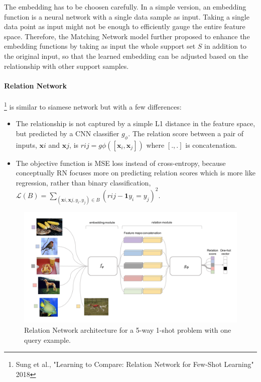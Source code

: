 \documentclass[main]{subfiles}
\begin{document}
The embedding has to be choosen carefully. In a simple version, an embedding function is a neural network with a single data sample as input. Taking a single data point as input might not be enough to efficiently gauge the entire feature space. Therefore, the Matching Network model further proposed to enhance the embedding functions by taking as input the whole support set $S$ in addition to the original input, so that the learned embedding can be adjusted based on the relationship with other support samples.

\paragraph{Relation Network}\footnote{Sung et al., "Learning to Compare: Relation Network for Few-Shot Learning" 2018} is similar to siamese network but with a few differences:
\begin{itemize}
    \item The relationship is not captured by a simple L1 distance in the feature space, but predicted by a CNN classifier $g_\phi$. The relation score between a pair of inputs, $\mathbf{x}i$ and $\mathbf{x}j$, is $r{i j} = g\phi([\mathbf{x}_i, \mathbf{x}_j])$ where $[.,.]$ is concatenation.
    \item The objective function is MSE loss instead of cross-entropy, because conceptually RN focuses more on predicting relation scores which is more like regression, rather than binary classification, $\mathcal{L}(B) = \sum_{(\mathbf{x}i, \mathbf{x}j, y_i, y_j)\in B} (r{i j} - \mathbf{1}{y_i=y_j})^2$.
\end{itemize}
%
\begin{figure}[H]
    \centering
    \includegraphics[width=0.95\linewidth]{14_ContinualMetaAndTransferLearning/figures/relation_network.png}
    \caption{Relation Network architecture for a 5-way 1-shot problem with one query example.}
    \label{fig:my_label}
\end{figure}
\end{document}
